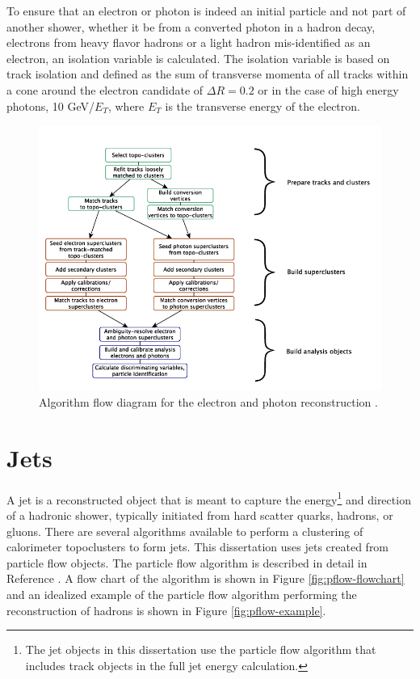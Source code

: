 		To ensure that an electron or photon is indeed an initial particle and not part of another shower, whether it be from a converted photon in a hadron decay, electrons from heavy flavor hadrons or a light hadron mis-identified as an electron, an isolation variable is calculated. The isolation variable is based on track isolation and defined as the sum of transverse momenta of all tracks within a cone around the electron candidate of $\Delta R = 0.2$ or in the case of high energy photons, 10 GeV/$E_T$, where $E_T$ is the transverse energy of the electron.

		\begin{figure}[!ht]
		\centering
		\includegraphics[width=\textwidth,keepaspectratio=true]{chapters/chapter5_eventreconnstruction/images/egamma_flow_01.png}
		\caption{\label{fig:egamma-reco} Algorithm flow diagram for the electron and photon reconstruction \cite{electron-perf}.}
		\end{figure}

	\section{Jets}\label{sec:reco-jets}
		A jet is a reconstructed object that is meant to capture the energy\footnote{The jet objects in this dissertation use the particle flow algorithm that includes track objects in the full jet energy calculation.} and direction of a hadronic shower, typically initiated from hard scatter quarks, hadrons, or gluons. There are several algorithms available to perform a clustering of calorimeter topoclusters to form jets. This dissertation uses jets created from particle flow objects. The particle flow algorithm is described in detail in Reference \cite{pflow}. A flow chart of the algorithm is shown in Figure \ref{fig:pflow-flowchart} and an idealized example of the particle flow algorithm performing the reconstruction of hadrons is shown in Figure \ref{fig:pflow-example}. 

